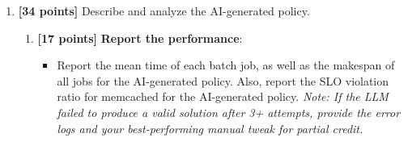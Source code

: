 \begin{enumerate}
\begin{enumerate}
\begin{itemize}
        We therefore selected the more conservative final hand-crafted policy.
        It gives the full node A to  and then to
        , moves  to the three batch cores on
        node B, and only overlaps  with  at the
        tail on disjoint node-A cores. It also keeps  away from
        the unstable node-B placement and uses a safe power-of-two thread count.
        The selected final policy was slightly less aggressive than the best
        single observed run of the competing policy, but across the three
        selected executions it had a mean makespan of \(232.33\,\mathrm{s}\),
        a standard deviation of \(3.06\,\mathrm{s}\), and zero memcached SLO
        violations. We chose it because it was fast, easy to reason about, and
        more stable across repeated runs.
        \\
    

    \end{itemize}
    \end{enumerate}
\newpage

    \item \textbf{[34 points]} Describe and analyze the AI-generated policy.

    \begin{enumerate}

        \item \textbf{[17 points]} \textbf{Report the performance}:
        
        \begin{itemize}
            \item Report the mean time of each batch job, as well as the makespan of all jobs for the AI-generated policy. Also, report the SLO violation ratio for memcached for the AI-generated policy. \textit{Note: If the LLM failed to produce a valid solution after 3+ attempts, provide the error logs and your best-performing manual tweak for partial credit.}
        

\end{itemize}
\end{enumerate}
\end{enumerate}
